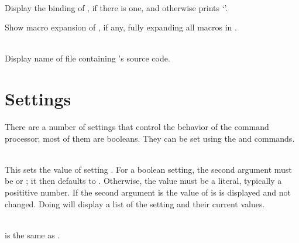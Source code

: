 \begin{description}
\item {}\\
    Display the binding of , if there is one, and otherwise
    prints `'.
 
\item {}
    Show macro expansion of , if any, fully expanding all 
    macros in .

\item {}\\
    Display name of file containing 's source code.
\end{description}

\section{Settings}

There are a number of settings that control the behavior of the
 command processor; most of them are booleans.
They can be set using the  and  commands.

\begin{description}
\item {}\\
    This sets the value of setting .
    For a boolean setting, the second argument must be  or
    ; it then defaults to .
    Otherwise, the value must be a literal, typically a posititive number.
    If the second argument is  the value of  is
    is displayed and not changed.
    Doing  will display a list of the setting and
    their current values.

\item {}\\
     is the same as
    .
\end{description}


